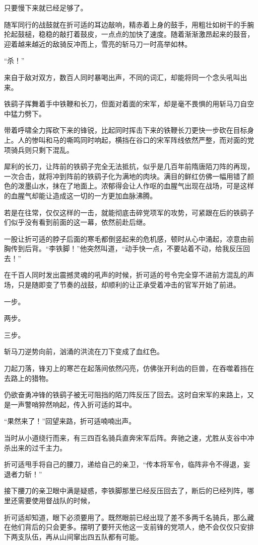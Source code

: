 只要慢下来就已经足够了。

随军同行的战鼓就在折可适的耳边敲响，精赤着上身的鼓手，用粗壮如树干的手腕抡起鼓槌，稳稳的敲打着鼓皮，一点点的加快了速度。随着渐渐激昂起来的鼓音，迎着越来越近的敌骑反冲而上，雪亮的斩马刀一时高举如林。

“杀！”

来自于敌对双方，数百人同时暴喝出声，不同的词汇，却能将同一个念头吼叫出来。

铁鹞子挥舞着手中铁鞭和长刀，但面对着面的宋军，却是毫不畏惧的用斩马刀自空中猛力劈下。

带着呼啸全力挥砍下来的锋锐，比起同时挥击下来的铁鞭长刀更快一步砍在目标身上。人的惨叫和马的嘶鸣同时响起，横挡在谷口的宋军阵线依然严整，而对面的党项骑兵则只剩下混乱。

犀利的长刀，让阵前的铁鹞子完全无法抵抗，似乎是几百年前隋唐陌刀阵的再现，一次合击，就将冲到阵前的铁鹞子化为满地的肉块。满目的鲜红仿佛一幅用错了颜色的泼墨山水，抹在了地面上。浓郁得会让人作呕的血腥气出现在战场，可是这样的血腥气却能让造成这一切的一方更加血脉沸腾。

若是在往常，仅仅这样的一击，就能彻底击碎党项军的攻势，可紧跟在后的铁鹞子们似乎没有看到前面的这一幕，依然前赴后继。

一股让折可适的脖子后面的寒毛都倒竖起来的危机感，顿时从心中涌起，凉意由前胸传到后背。“李铁脚！”他突然叫道，“动手快一点，不要站着不动，给我反压回去！”

在千百人同时发出震撼灵魂的吼声的时候，折可适的号令完全穿不进前方混乱的声场，只是随即变了节奏的战鼓，却顺利的让正承受着冲击的官军开始了前进。

一步。

两步。

三步。

斩马刀逆势向前，汹涌的洪流在刀下变成了血红色。

刀起刀落，锋刃上的寒芒在起落间依然闪亮，仿佛张开利齿的巨兽，在吞噬着挡在去路上的猎物。

仍欲奋勇冲锋的铁鹞子被无可阻挡的陌刀阵反压了回去。这时自宋军的来路上，又是一声警哨猝然响起，传入折可适的耳中。

“果然来了！”回望来路，折可适喃喃出声。

当时从小道绕行而来，有三四百名骑兵直奔宋军后阵。奔驰之速，尤胜从支谷中冲杀出来的过千主力。

折可适甩手将自己的腰刀，递给自己的亲卫，“传本将军令，临阵非令不得退，妄退者力斩！”

接下腰刀的亲卫眼中满是疑惑，李铁脚那里已经反压回去了，断后的已经列阵，哪里还需要使用督战队的时候，

折可适却知道，眼下必须要用了。既然眼前已经出现了差不多两千名骑兵，那么藏在他们背后的只会更多。摆明了要歼灭他这一支前锋的党项人，绝不会仅仅只安排下两支队伍，再从山间窜出四五队都有可能。


